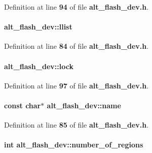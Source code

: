 Definition at line {\bf 94} of file {\bf alt\+\_\+flash\+\_\+dev.\+h}.

\paragraph[{llist}]{ alt\+\_\+flash\+\_\+dev\+::llist}\label{structalt__flash__dev_ac962656e844d340fb81b5b7c2a3cc9e1}


Definition at line {\bf 84} of file {\bf alt\+\_\+flash\+\_\+dev.\+h}.

\paragraph[{lock}]{ alt\+\_\+flash\+\_\+dev\+::lock}\label{structalt__flash__dev_a7d470439d3040f6ae837d3d2db67ba40}


Definition at line {\bf 97} of file {\bf alt\+\_\+flash\+\_\+dev.\+h}.

\paragraph[{name}]{\setlength{\rightskip}{0pt plus 5cm}const char$\ast$ alt\+\_\+flash\+\_\+dev\+::name}\label{structalt__flash__dev_a0bace47af7bf560aac884d0da4781e9b}


Definition at line {\bf 85} of file {\bf alt\+\_\+flash\+\_\+dev.\+h}.

\paragraph[{number\+\_\+of\+\_\+regions}]{\setlength{\rightskip}{0pt plus 5cm}int alt\+\_\+flash\+\_\+dev\+::number\+\_\+of\+\_\+regions}\label{structalt__flash__dev_abe73274fd38343f5b26cfefd9119b082}


